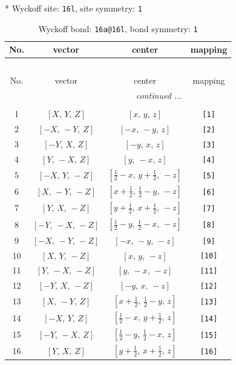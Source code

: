 \documentclass[fleqn,8pt]{jsarticle}
\begin{document}
* Wyckoff site: {\tt 16l}, site symmetry: {\tt 1}
\renewcommand{\arraystretch}{1.2}
\begin{longtable}{cccc}
\caption{Wyckoff bond: {\tt 16a@16l}, bond symmetry: {\tt 1}}
 \\
 \hline \hline
No. & vector & center & mapping \\ \hline \endfirsthead

\multicolumn{3}{l}{\tablename\ \thetable{}} \\
 \hline \hline
No. & vector & center & mapping \\ \hline \endhead

 \hline \hline
\multicolumn{3}{r}{\footnotesize\it continued ...} \\ \endfoot

 \hline \hline
\multicolumn{3}{r}{} \\ \endlastfoot

1 & $\left[ X,\, Y,\, Z \right]$ & $\left[ x,\, y,\, z \right]$ & {\tt [1]} \\ \hline
2 & $\left[ - X,\, - Y,\, Z \right]$ & $\left[ - x,\, - y,\, z \right]$ & {\tt [2]} \\ \hline
3 & $\left[ - Y,\, X,\, Z \right]$ & $\left[ - y,\, x,\, z \right]$ & {\tt [3]} \\ \hline
4 & $\left[ Y,\, - X,\, Z \right]$ & $\left[ y,\, - x,\, z \right]$ & {\tt [4]} \\ \hline
5 & $\left[ - X,\, Y,\, - Z \right]$ & $\left[ \frac{1}{2} - x,\, y + \frac{1}{2},\, - z \right]$ & {\tt [5]} \\ \hline
6 & $\left[ X,\, - Y,\, - Z \right]$ & $\left[ x + \frac{1}{2},\, \frac{1}{2} - y,\, - z \right]$ & {\tt [6]} \\ \hline
7 & $\left[ Y,\, X,\, - Z \right]$ & $\left[ y + \frac{1}{2},\, x + \frac{1}{2},\, - z \right]$ & {\tt [7]} \\ \hline
8 & $\left[ - Y,\, - X,\, - Z \right]$ & $\left[ \frac{1}{2} - y,\, \frac{1}{2} - x,\, - z \right]$ & {\tt [8]} \\ \hline
9 & $\left[ - X,\, - Y,\, - Z \right]$ & $\left[ - x,\, - y,\, - z \right]$ & {\tt [9]} \\ \hline
10 & $\left[ X,\, Y,\, - Z \right]$ & $\left[ x,\, y,\, - z \right]$ & {\tt [10]} \\ \hline
11 & $\left[ Y,\, - X,\, - Z \right]$ & $\left[ y,\, - x,\, - z \right]$ & {\tt [11]} \\ \hline
12 & $\left[ - Y,\, X,\, - Z \right]$ & $\left[ - y,\, x,\, - z \right]$ & {\tt [12]} \\ \hline
13 & $\left[ X,\, - Y,\, Z \right]$ & $\left[ x + \frac{1}{2},\, \frac{1}{2} - y,\, z \right]$ & {\tt [13]} \\ \hline
14 & $\left[ - X,\, Y,\, Z \right]$ & $\left[ \frac{1}{2} - x,\, y + \frac{1}{2},\, z \right]$ & {\tt [14]} \\ \hline
15 & $\left[ - Y,\, - X,\, Z \right]$ & $\left[ \frac{1}{2} - y,\, \frac{1}{2} - x,\, z \right]$ & {\tt [15]} \\ \hline
16 & $\left[ Y,\, X,\, Z \right]$ & $\left[ y + \frac{1}{2},\, x + \frac{1}{2},\, z \right]$ & {\tt [16]} \\
\end{longtable}
\end{document}
